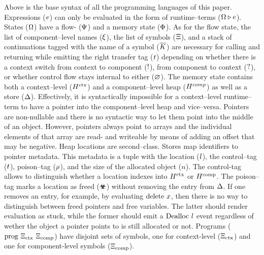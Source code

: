\documentclass[acmsmall,review,screen,dvipsnames]{acmart}
\begin{document}
Above is the base syntax of all the programming languages of this paper.
Expressions ($\expr$) can only be evaluated in the form of runtime--terms ($\rtt{\statevar}{\expr}$).
States ($\statevar$) have a flow- ($\cfstate$) and a memory state ($\memstate$).
As for the flow state, the list of component--level names ($\commlib$), the list of symbols ($\library$), and a stack of continuations tagged with the name of a symbol ($\ectxstack$) are necessary for calling and returning while emitting the right transfer tag ($\sandboxtag$) depending on whether there is a context switch from context to component ($\comptoctx$), from component to context ($\ctxtocomp$), or whether control flow stays internal to either ($\nocomm$).
The memory state contains both a context--level ($\heap[^{\ctx}]$) and a component--level heap ($\heap[^{comp}]$) as well as a store ($\store$).
Effectively, it is syntactically impossible for a context--level runtime--term to have a pointer into the component--level heap and vice--versa.
Pointers are non-nullable and there is no syntactic way to let them point into the middle of an object.
However, pointers always point to arrays and the individual elements of that array are read- and writeable by means of adding an offset that may be negative.
Heap locations are second--class. %
Stores map identifiers to pointer metadata.
This metadata is a tuple with the location ($\loc$), the control--tag ($\sandboxtag$), poison--tag ($\poison$), and the size of the allocated object ($n$).
The control-tag allows to distinguish whether a location indexes into $\heap[^{\ctx}]$ or $\heap[^{\comp}]$.
The poison--tag marks a location as freed ($\poisoned$) without removing the entry from $\store$.
If one removes an entry, for example, by evaluating $\ldelete{x}$, then there is no way to distinguish between freed pointers and free variables.
The latter should render evaluation as stuck, while the former should emit a $\ev{Dealloc}\ \loc$ event regardless of wether the object a pointer points to is still allocated or not.
Programs ($\prog{\library_{\ctx}}{\library_{\comp}}$) have disjoint sets of symbols, one for context-level ($\library_{\ctx}$) and one for component-level symbols ($\library_{\comp}$).
\end{document}
